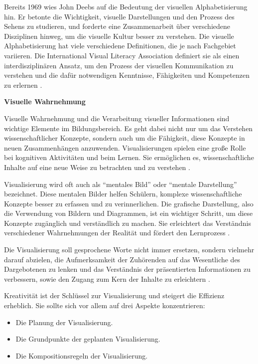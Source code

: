 Bereits 1969 wies John Deebs auf die Bedeutung der visuellen Alphabetisierung hin. Er betonte die Wichtigkeit, visuelle Darstellungen und den Prozess des Sehens zu studieren, und forderte eine Zusammenarbeit über verschiedene Disziplinen hinweg, um die visuelle Kultur besser zu verstehen. Die visuelle Alphabetisierung hat viele verschiedene Definitionen, die je nach Fachgebiet variieren. Die International Visual Literacy Association definiert sie als einen interdisziplinären Ansatz, um den Prozess der visuellen Kommunikation zu verstehen und die dafür notwendigen Kenntnisse, Fähigkeiten und Kompetenzen zu erlernen \cite{Wiebe2001}.

\textbf{Visuelle Wahrnehmung}

Visuelle Wahrnehmung und die Verarbeitung visueller Informationen sind wichtige Elemente im Bildungsbereich. Es geht dabei nicht nur um das Verstehen wissenschaftlicher Konzepte, sondern auch um die Fähigkeit, diese Konzepte in neuen Zusammenhängen anzuwenden. Visualisierungen spielen eine große Rolle bei kognitiven Aktivitäten und beim Lernen. Sie ermöglichen es, wissenschaftliche Inhalte auf eine neue Weise zu betrachten und zu verstehen \cite{Wiebe2001}.

Visualisierung wird oft auch als \enquote{mentales Bild} oder \enquote{mentale Darstellung} bezeichnet. Diese mentalen Bilder helfen Schülern, komplexe wissenschaftliche Konzepte besser zu erfassen und zu verinnerlichen. Die grafische Darstellung, also die Verwendung von Bildern und Diagrammen, ist ein wichtiger Schritt, um diese Konzepte zugänglich und verständlich zu machen. Sie erleichtert das Verständnis verschiedener Wahrnehmungen der Realität und fördert den Lernprozess \cite{Duval1999}.

Die Visualisierung soll gesprochene Worte nicht immer ersetzen, sondern vielmehr darauf abzielen, die Aufmerksamkeit der Zuhörenden auf das Wesentliche des Dargebotenen zu lenken und das Verständnis der präsentierten Informationen zu verbessern, sowie den Zugang zum Kern der Inhalte zu erleichtern \cite{Gilbert2005}.

Kreativität ist der Schlüssel zur Visualisierung und steigert die Effizienz erheblich. Sie sollte sich vor allem auf drei Aspekte konzentrieren:
\begin{itemize}
	\item Die Planung der Visualisierung.
	\item Die Grundpunkte der geplanten Visualisierung.
	\item Die Kompositionsregeln der Visualisierung.
\end{itemize}

